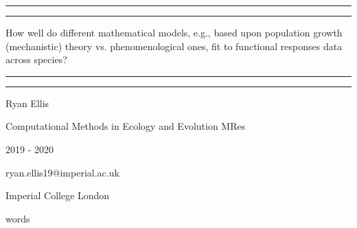 \documentclass[11pt, a4paper]{article} %
\newcommand\wordcount{} %
\begin{document}
\begin{titlepage} %

	\centering %
	
	\vspace*{\baselineskip} %
	
	\rule{\textwidth}{1.6pt}\vspace*{-\baselineskip}\vspace*{2pt} %
	\rule{\textwidth}{0.4pt} %
	
	\vspace{0.75\baselineskip} %
	
	{\huge How well do different mathematical models, e.g., based upon population growth (mechanistic) theory vs. phenomenological ones, fit to functional responses data across species?} %
	
	\vspace{0.75\baselineskip} %
	
	\rule{\textwidth}{0.4pt}\vspace*{-\baselineskip}\vspace{3.2pt} %
	\rule{\textwidth}{1.6pt} %
		
	\vspace{2\baselineskip} %
	
	{\LARGE Ryan Ellis} %
	\vspace*{0.75\baselineskip} %
	
	\Large %
	Computational Methods in Ecology and Evolution MRes
	\vspace*{0.75\baselineskip} %
	
	2019 - 2020
	\vspace*{0.75\baselineskip} %

	ryan.ellis19@imperial.ac.uk
	\vspace*{3\baselineskip} %
	
	Imperial College London
	\vspace*{3\baselineskip} %
	
	\wordcount words %
	
\end{titlepage}
\end{document}
